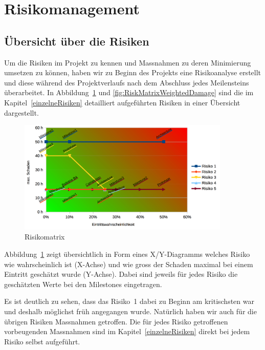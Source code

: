 \chapter*{Risikomanagement}
	
	\label{risiken}
	
	\section*{Übersicht über die Risiken}
		Um die Risiken im Projekt zu kennen und Massnahmen zu deren Minimierung umsetzen zu können, haben wir zu Beginn des Projekts eine Risikoanalyse erstellt und diese während des Projektverlaufs nach dem Abschluss jedes Meilensteins überarbeitet.
		In Abbildung~\ref{fig:RiskMatrix} und \ref{fig:RiskMatrixWeightedDamage} sind die im Kapitel~\ref{einzelneRisiken} detailliert aufgeführten Risiken in einer Übersicht dargestellt.
		
		\begin{figure}[H]
			\includegraphics[width=0.9\textwidth]{projectPlan/media/img/risikomatrix.png}
			\centering
			\caption{Risikomatrix}
			\label{fig:RiskMatrix}
		\end{figure}
	
		Abbildung~\ref{fig:RiskMatrix} zeigt übersichtlich in Form eines X/Y-Diagramms welches Risiko wie wahrscheinlich ist (X-Achse) und wie gross der Schaden maximal bei einem Eintritt geschätzt wurde (Y-Achse).
		Dabei sind jeweils für jedes Risiko die geschätzten Werte bei den Milestones eingetragen.
		
		Es ist deutlich zu sehen, dass das Risiko~1 dabei zu Beginn am kritischsten war und deshalb möglichst früh angegangen wurde.
		Natürlich haben wir auch für die übrigen Risiken Massnahmen getroffen.
		Die für jedes Risiko getroffenen vorbeugenden Massnahmen sind im Kapitel~\ref{einzelneRisiken} direkt bei jedem Risiko selbst aufgeführt.
	

